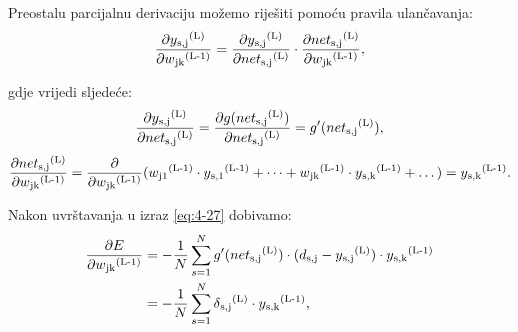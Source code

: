 \documentclass[times, utf8, zavrsni]{fer}
\begin{document}
Preostalu parcijalnu derivaciju možemo riješiti pomoću pravila ulančavanja:
\begin{equation}
    \frac{\partial y\textsubscript{s,j}\textsuperscript{(L)}}{\partial w\textsubscript{jk}\textsuperscript{(L-1)}} = \frac{\partial y\textsubscript{s,j}\textsuperscript{(L)}}{\partial net\textsubscript{s,j}\textsuperscript{(L)}} \cdot \frac{\partial net\textsubscript{s,j}\textsuperscript{(L)}}{\partial w\textsubscript{jk}\textsuperscript{(L-1)}},
\end{equation}

gdje vrijedi sljedeće:
\begin{equation}
    \frac{\partial y\textsubscript{s,j}\textsuperscript{(L)}}{\partial net\textsubscript{s,j}\textsuperscript{(L)}} = \frac{\partial g(net\textsubscript{s,j}\textsuperscript{(L)})}{\partial net\textsubscript{s,j}\textsuperscript{(L)}} = g'(net\textsubscript{s,j}\textsuperscript{(L)}),
\end{equation}
\begin{equation}
    \frac{\partial net\textsubscript{s,j}\textsuperscript{(L)}}{\partial w\textsubscript{jk}\textsuperscript{(L-1)}} = \frac{\partial}{\partial w\textsubscript{jk}\textsuperscript{(L-1)}}(w\textsubscript{j1}\textsuperscript{(L-1)}\cdot y\textsubscript{s,1}\textsuperscript{(L-1)} + \dots + w\textsubscript{jk}\textsuperscript{(L-1)}\cdot y\textsubscript{s,k}\textsuperscript{(L-1)} + \dots) = y\textsubscript{s,k}\textsuperscript{(L-1)}.
\end{equation}

Nakon uvrštavanja u izraz \eqref{eq:4-27} dobivamo:
\begin{align}
    \frac{\partial E}{\partial w\textsubscript{jk}\textsuperscript{(L-1)}} &= -\frac{1}{N}\sum\limits_{s=1}^N g'(net\textsubscript{s,j}\textsuperscript{(L)})\cdot(d\textsubscript{s,j} - y\textsubscript{s,j}\textsuperscript{(L)})\cdot y\textsubscript{s,k}\textsuperscript{(L-1)} \\
    &= -\frac{1}{N}\sum\limits_{s=1}^N \delta\textsubscript{s,j}\textsuperscript{(L)} \cdot y\textsubscript{s,k}\textsuperscript{(L-1)},
\end{align}
\end{document}
